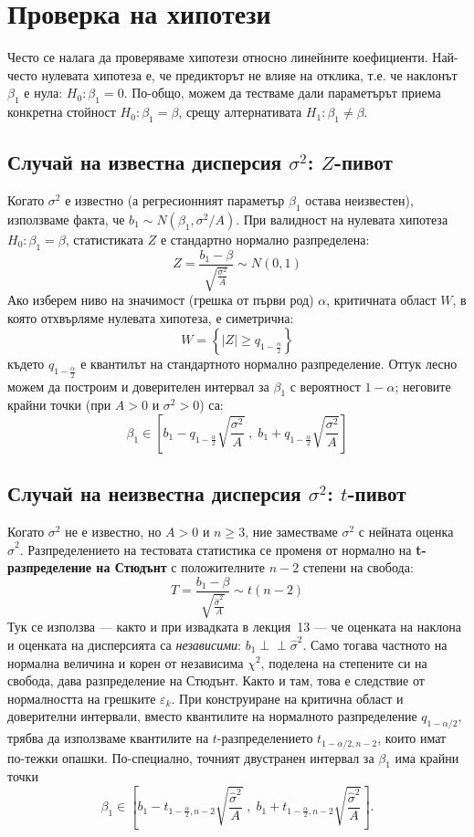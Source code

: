 \section{Проверка на хипотези}

Често се налага да проверяваме хипотези относно линейните коефициенти. Най-често нулевата хипотеза е, че предикторът не влияе на отклика, т.е. че наклонът $\beta_1$ е нула: $H_0: \beta_1 = 0$. По-общо, можем да тестваме дали параметърът приема конкретна стойност $H_0: \beta_1 = \beta$, срещу алтернативата $H_1: \beta_1 \neq \beta$.

\subsection{Случай на известна дисперсия $\sigma^2$: $Z$-пивот}
Когато $\sigma^2$ е известно (а регресионният параметър $\beta_1$ остава неизвестен), използваме факта, че $b_1 \sim N(\beta_1, \sigma^2/A)$. При валидност на нулевата хипотеза $H_0: \beta_1 = \beta$, статистиката $Z$ е стандартно нормално разпределена:
\[
Z = \frac{b_1 - \beta}{\sqrt{\frac{\sigma^2}{A}}} \sim N(0, 1)
\]
Ако изберем ниво на значимост (грешка от първи род) $\alpha$, критичната област $W$, в която отхвърляме нулевата хипотеза, е симетрична:
\[
W = \left\{ |Z| \geq q_{1-\frac{\alpha}{2}} \right\}
\]
където $q_{1-\frac{\alpha}{2}}$ е квантилът на стандартното нормално разпределение.
Оттук лесно можем да построим и доверителен интервал за $\beta_1$ с вероятност $1-\alpha$; неговите крайни точки (при $A>0$ и $\sigma^2>0$) са:
\[
\beta_1 \in \left[ b_1 - q_{1-\frac{\alpha}{2}}\sqrt{\frac{\sigma^2}{A}} \; , \; b_1 + q_{1-\frac{\alpha}{2}}\sqrt{\frac{\sigma^2}{A}} \right]
\]

\subsection{Случай на неизвестна дисперсия $\sigma^2$: $t$-пивот}
Когато $\sigma^2$ не е известно, но $A>0$ и $n\geq 3$, ние заместваме $\sigma^2$ с нейната оценка $\hat{\sigma}^2$. Разпределението на тестовата статистика се променя от нормално на \textbf{t-разпределение на Стюдънт} с положителните $n-2$ степени на свобода:
\[
T = \frac{b_1 - \beta}{\sqrt{\frac{\hat{\sigma}^2}{A}}} \sim t(n-2)
\]
Тук се използва — както и при извадката в лекция~13 — че оценката на наклона и оценката на
дисперсията са \emph{независими}: $b_1 \perp\!\!\!\perp \hat{\sigma}^2$. Само тогава
частното на нормална величина и корен от независима $\chi^2$, поделена на степените си на
свобода, дава разпределение на Стюдънт. Както и там, това е следствие от нормалността на
грешките $\varepsilon_k$.
При конструиране на критична област и доверителни интервали, вместо квантилите на нормалното разпределение $q_{1-\alpha/2}$, трябва да използваме квантилите на $t$-разпределението $t_{1-\alpha/2, n-2}$, които имат по-тежки опашки.
По-специално, точният двустранен интервал за $\beta_1$ има крайни точки
\[
\beta_1\in\left[ b_1 - t_{1-\frac{\alpha}{2},n-2}\sqrt{\frac{\hat{\sigma}^2}{A}} \; , \; b_1 + t_{1-\frac{\alpha}{2},n-2}\sqrt{\frac{\hat{\sigma}^2}{A}} \right].
\]

